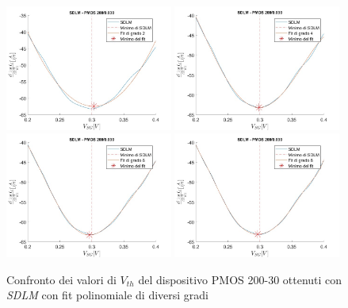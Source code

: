\documentclass[12pt, letterpaper]{book}
\begin{document}
\begin{figure}[h!]
\label{fig:GradiSDLM} 
\centering
 \includegraphics[width=0.49\textwidth]{SDLM-P1-100-30-grado2}
 \includegraphics[width=0.49\textwidth]{SDLM-P1-100-30-grado4}
 \includegraphics[width=0.49\textwidth]{SDLM-P1-100-30-grado6}
 \includegraphics[width=0.49\textwidth]{SDLM-P1-100-30-grado8}
 \caption{Confronto dei valori di $V_{th}$ del dispositivo PMOS 200-30 ottenuti con \emph{SDLM} con fit polinomiale di diversi gradi}
\end{figure}
\end{document}
